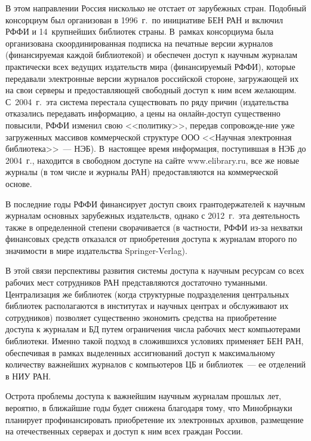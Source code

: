 \begin{multicols}{2}
   В этом направлении Россия нисколько не отстает от зарубежных стран. Подобный 
консорциум был организован в 1996~г.\ по инициативе БЕН РАН и включил РФФИ и 
14~крупнейших библиотек страны. В~рамках консорциума была организована 
скоординированная подписка на печатные версии журналов (финансируемая каждой 
библиотекой) и обеспечен доступ к научным журналам практически всех ведущих 
издательств мира (финансируемый РФФИ), которые передавали электронные версии 
журналов российской стороне, загружающей их на свои серверы и предоставляющей 
свободный доступ к ним всем желающим. С~2004~г.\ эта система перестала существовать 
по ряду причин (издательства отказались передавать информацию, а цены на 
   он\-лайн-до\-ступ существенно повысили, РФФИ\linebreak
   изменил свою <<политику>>, 
передав сопровожде-\linebreak ние уже загруженных массивов коммерческой\linebreak
 структуре ООО 
<<Научная электронная библиотека>>~--- НЭБ). В~настоящее время информация, 
поступившая в НЭБ до 2004~г., находится в свободном доступе на сайте {\sf 
www.elibrary.ru}, все же новые журналы (в том числе и журналы РАН) предоставляются 
на коммерческой основе. 
   
   В последние годы РФФИ финансирует доступ своих грантодержателей к научным 
журналам основных зарубежных издательств, однако с 2012~г.\ эта деятельность также в 
определенной степени сворачивается (в частности, РФФИ из-за нехватки 
финансовых средств
отказался  от приобретения доступа к журналам второго по значимости в мире 
издательства Springer-Verlag). 
   
   В этой связи перспективы развития системы доступа к научным ресурсам со всех 
рабочих мест сотруд\-ни\-ков РАН представляются достаточно туманными. Централизация 
же библиотек (когда структурные подразделения центральных библиотек располагаются в 
институтах и научных центрах и обслуживают их сотрудников) позволяет существенно 
экономить средства на приобретение доступа к журналам и БД путем 
ограничения числа рабочих мест компьютерами библиотеки. Именно такой подход в 
сложившихся условиях применяет БЕН РАН, обеспечивая в рамках выделенных 
ассигнований доступ к максимальному количеству важнейших журналов с компьютеров 
ЦБ и библиотек~--- ее отделений в НИУ РАН. 
   
   Острота проблемы доступа к важнейшим научным журналам прошлых лет, вероятно, в 
ближайшие годы будет снижена благодаря тому, что Минобрнауки планирует 
профинансировать приобретение их электронных архивов, размещение на отечественных 
серверах и доступ к ним всех граж\-дан России.
   

\end{multicols}
